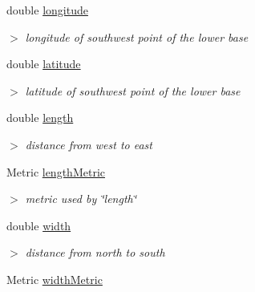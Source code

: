 \begin{DoxyCompactItemize}
\item 
\hypertarget{classCuboid_aca08c9b1c33c722ddfd46405b568ba65}{double \hyperlink{classCuboid_aca08c9b1c33c722ddfd46405b568ba65}{longitude}}\label{classCuboid_aca08c9b1c33c722ddfd46405b568ba65}

\begin{DoxyCompactList}\small\item\em $>$ longitude of southwest point of the lower base \end{DoxyCompactList}\item 
\hypertarget{classCuboid_aec4c8b92658c731e2b8745e6b2418375}{double \hyperlink{classCuboid_aec4c8b92658c731e2b8745e6b2418375}{latitude}}\label{classCuboid_aec4c8b92658c731e2b8745e6b2418375}

\begin{DoxyCompactList}\small\item\em $>$ latitude of southwest point of the lower base \end{DoxyCompactList}\item 
\hypertarget{classCuboid_ae1fa9e6e59887437842de9fdc9cdc13b}{double \hyperlink{classCuboid_ae1fa9e6e59887437842de9fdc9cdc13b}{length}}\label{classCuboid_ae1fa9e6e59887437842de9fdc9cdc13b}

\begin{DoxyCompactList}\small\item\em $>$ distance from west to east \end{DoxyCompactList}\item 
\hypertarget{classCuboid_a979bb7b92b101cfac63780b705c280c4}{\-Metric \hyperlink{classCuboid_a979bb7b92b101cfac63780b705c280c4}{length\-Metric}}\label{classCuboid_a979bb7b92b101cfac63780b705c280c4}

\begin{DoxyCompactList}\small\item\em $>$ metric used by \char`\"{}length\char`\"{} \end{DoxyCompactList}\item 
\hypertarget{classCuboid_a441591b764c8afbf763c77f28a9903b7}{double \hyperlink{classCuboid_a441591b764c8afbf763c77f28a9903b7}{width}}\label{classCuboid_a441591b764c8afbf763c77f28a9903b7}

\begin{DoxyCompactList}\small\item\em $>$ distance from north to south \end{DoxyCompactList}\item 
\hypertarget{classCuboid_a12b3c54f5ba533d55b6ff998dd2a341a}{\-Metric \hyperlink{classCuboid_a12b3c54f5ba533d55b6ff998dd2a341a}{width\-Metric}}\label{classCuboid_a12b3c54f5ba533d55b6ff998dd2a341a}


\end{DoxyCompactItemize}
